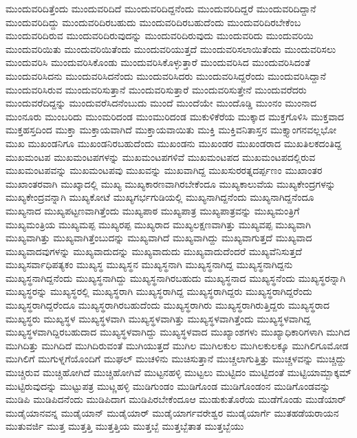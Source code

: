 {ಮುಂದುವರಿದಿತ್ತೆಂದು
ಮುಂದುವರಿದಿದೆ
ಮುಂದುವರಿದಿದ್ದನೆಂದು
ಮುಂದುವರಿದಿದ್ದರೆ
ಮುಂದುವರಿದಿದ್ದಾನೆ
ಮುಂದುವರಿದಿದ್ದು
ಮುಂದುವರಿದಿರಬಹುದು
ಮುಂದುವರಿದಿರಬಹುದೆಂದು
ಮುಂದುವರಿದಿರಬೇಕೆಂಬ
ಮುಂದುವರಿದಿರುವ
ಮುಂದುವರಿದಿರುವುದನ್ನು
ಮುಂದುವರಿದಿರುವುದು
ಮುಂದುವರಿದು
ಮುಂದುವರಿಯಿ
ಮುಂದುವರಿಯಿತು
ಮುಂದುವರಿಯಿತೆಂದು
ಮುಂದುವರಿಯುತ್ತದೆ
ಮುಂದುವರಿಸಲಾಯಿತೆಂದು
ಮುಂದುವರಿಸಲು
ಮುಂದುವರಿಸಿ
ಮುಂದುವರಿಸಿಕೊಂಡು
ಮುಂದುವರಿಸಿಕೊಳ್ಳುತ್ತಾರೆ
ಮುಂದುವರಿಸಿದ
ಮುಂದುವರಿಸಿದಂತೆ
ಮುಂದುವರಿಸಿದನು
ಮುಂದುವರಿಸಿದನೆಂದು
ಮುಂದುವರಿಸಿದರು
ಮುಂದುವರಿಸಿದ್ದರೆಂದು
ಮುಂದುವರಿಸಿದ್ದಾನೆ
ಮುಂದುವರಿಸಿರುವ
ಮುಂದುವರಿಸುತ್ತಾನೆ
ಮುಂದುವರಿಸುತ್ತಾರೆ
ಮುಂದುವರಿಸುತ್ತೇನೆ
ಮುಂದುವರೆದರು
ಮುಂದುವರೆದಿದ್ದನ್ನು
ಮುಂದುವರೆಸಿದನೆಂಬುದು
ಮುಂದೆ
ಮುಂದೆಯೇ
ಮುಂದೊಡ್ಡಿ
ಮುಂನಂ
ಮುಂನಾದ
ಮುಂನೂರು
ಮುಂಬರಿದು
ಮುಂಮರಿದಂಡ
ಮುಂಮುರಿದಂಡ
ಮುಕುಳಿಕೆರೆಯ
ಮುಕ್ಕಾದ
ಮುಕ್ತಗೊಳಿಸಿ
ಮುಕ್ತವಾದ
ಮುಕ್ತಹಸ್ತದಿಂದ
ಮುಕ್ತಾ
ಮುಕ್ತಾಯವಾಗಿದೆ
ಮುಕ್ತಾಯವಾಯಿತು
ಮುಕ್ತಿ
ಮುಕ್ತಿವನಿತಾಸ್ತನ
ಮುಕ್ತ್ಯಾಂಗನವಲ್ಲಭೋ
ಮುಖ
ಮುಖಂಡನಿಗೂ
ಮುಖಂಡನಿರಬಹುದೆಂದು
ಮುಖಂಡನು
ಮುಖಂಡರ
ಮುಖಂಡರಾದ
ಮುಖತಿಲಕದಂತಿದ್ದ
ಮುಖಮಂಟಪ
ಮುಖಮಂಟಪಗಳನ್ನು
ಮುಖಮಂಟಪಗಳಿವೆ
ಮುಖಮಂಟಪದ
ಮುಖಮಂಟಪದಲ್ಲಿರುವ
ಮುಖಮಂಟಪವನ್ನು
ಮುಖಮಂಟಪವು
ಮುಖವನ್ನು
ಮುಖವಾಗಿದ್ದ
ಮುಖಸುರರತ್ನದರ್ಪ್ಪಣಂ
ಮುಖಾಂತರ
ಮುಖಾಂತರವಾಗಿ
ಮುಖ್ಕಾದಲ್ಲಿ
ಮುಖ್ಯ
ಮುಖ್ಯಕಾರಣವಾಗಿರಬೇಕೆಂದೂ
ಮುಖ್ಯಕಾಲುವೆಯ
ಮುಖ್ಯಕೇಂದ್ರಗಳನ್ನು
ಮುಖ್ಯಕೇಂದ್ರವನ್ನಾಗಿ
ಮುಖ್ಯಕೋಟೆ
ಮುಖ್ಯಗರ್ಭಗುಡಿಯಲ್ಲಿ
ಮುಖ್ಯನಾಗಿದ್ದನೆಂದು
ಮುಖ್ಯನಾಗಿದ್ದನೆಂದೂ
ಮುಖ್ಯನಾದ
ಮುಖ್ಯಪಟ್ಟಣವಾಗಿತ್ತೆಂದು
ಮುಖ್ಯಪಾಠ
ಮುಖ್ಯಪಾತ್ರ
ಮುಖ್ಯಪಾತ್ರವನ್ನು
ಮುಖ್ಯಮಂತ್ರಿಗೆ
ಮುಖ್ಯಮಂತ್ರಿಯ
ಮುಖ್ಯಮಪ್ಪ
ಮುಖ್ಯರಪ್ಪ
ಮುಖ್ಯರಾದ
ಮುಖ್ಯಲಕ್ಷಣವಾಗಿತ್ತು
ಮುಖ್ಯವಪ್ಪ
ಮುಖ್ಯವಾಗಿ
ಮುಖ್ಯವಾಗಿತ್ತು
ಮುಖ್ಯವಾಗಿತ್ತೆಂಬುದನ್ನು
ಮುಖ್ಯವಾಗಿದೆ
ಮುಖ್ಯವಾಗಿದ್ದು
ಮುಖ್ಯವಾಗುತ್ತದೆ
ಮುಖ್ಯವಾದ
ಮುಖ್ಯವಾದವುಗಳನ್ನು
ಮುಖ್ಯವಾದುದನ್ನು
ಮುಖ್ಯವಾದುದು
ಮುಖ್ಯವಾದುದೆಂದರೆ
ಮುಖ್ಯವೆನಿಸುತ್ತದೆ
ಮುಖ್ಯಸರ್ವಾಧಿಪತ್ಯಕಂ
ಮುಖ್ಯಸ್ಥ
ಮುಖ್ಯಸ್ಥನ
ಮುಖ್ಯಸ್ಥನಾಗಿ
ಮುಖ್ಯಸ್ಥನಾಗಿದ್ದ
ಮುಖ್ಯಸ್ಥನಾಗಿದ್ದನು
ಮುಖ್ಯಸ್ಥನಾಗಿದ್ದನೆಂದು
ಮುಖ್ಯಸ್ಥನಾಗಿದ್ದು
ಮುಖ್ಯಸ್ಥನಾಗಿರಬಹುದು
ಮುಖ್ಯಸ್ಥನಾದ
ಮುಖ್ಯಸ್ಥನೆಂದು
ಮುಖ್ಯಸ್ಥರನ್ನಾಗಿ
ಮುಖ್ಯಸ್ಥರನ್ನು
ಮುಖ್ಯಸ್ಥರಲ್ಲಿ
ಮುಖ್ಯಸ್ಥರಾಗಿ
ಮುಖ್ಯಸ್ಥರಾಗಿದ್ದ
ಮುಖ್ಯಸ್ಥರಾಗಿದ್ದರು
ಮುಖ್ಯಸ್ಥರಾಗಿದ್ದರೆಂದು
ಮುಖ್ಯಸ್ಥರಾಗಿದ್ದರೆಂದೂ
ಮುಖ್ಯಸ್ಥರಾಗಿರಬಹುದೆಂದು
ಮುಖ್ಯಸ್ಥರಾಗಿರು
ಮುಖ್ಯಸ್ಥರಾಗಿರುತ್ತಿದ್ದರು
ಮುಖ್ಯಸ್ಥರಾದ
ಮುಖ್ಯಸ್ಥರು
ಮುಖ್ಯಸ್ಥಳ
ಮುಖ್ಯಸ್ಥಳವಾಗಿ
ಮುಖ್ಯಸ್ಥಳವಾಗಿತ್ತು
ಮುಖ್ಯಸ್ಥಳವಾಗಿತ್ತೆಂದು
ಮುಖ್ಯಸ್ಥಳವಾಗಿದ್ದ
ಮುಖ್ಯಸ್ಥಳವಾಗಿದ್ದಿರಬಹುದಾದ
ಮುಖ್ಯಸ್ಥಳವಾಗಿದ್ದು
ಮುಖ್ಯಸ್ಥಳವಾದ
ಮುಖ್ಯಾಂಶಗಳು
ಮುಖ್ಯಾಧಿಕಾರಿಗಳಾಗಿ
ಮುಗಿದ
ಮುಗಿದಿತ್ತು
ಮುಗಿದಿದೆ
ಮುಗಿದಿರುವಂತೆ
ಮುಗಿಯುತ್ತದೆ
ಮುಗಿಲ
ಮುಗಿಲಕುಲ
ಮುಗಿಲಕುಲಕ್ಕೂ
ಮುಗಿಲಿಗೂಮೋಡ
ಮುಗಿಲಿಗೆ
ಮುಗುಳ್ನಗೆಯೊಂದಿಗೆ
ಮುಘಲ್
ಮುಚಳಿನು
ಮುಚಿಸುತ್ತಾನೆ
ಮುಚ್ಚಲಾಗುತ್ತಿತ್ತು
ಮುಚ್ಚಳವನ್ನು
ಮುಚ್ಚಿದ್ದು
ಮುಚ್ಚಿರುವ
ಮುಚ್ಚಿಹೋಗಿದೆ
ಮುಚ್ಚಿಹೋಗಿವೆ
ಮುಟ್ಟನಹಳ್ಳಿ
ಮುಟ್ಟಲು
ಮುಟ್ಟಿದಂ
ಮುಟ್ಟಿದಂತೆ
ಮುಟ್ಟಿಯಾಮ್ಬಾಕ್ಕಮ್
ಮುಟ್ಟಿರುವುದನ್ನು
ಮುಟ್ಟುಪತ್ರ
ಮುಟ್ಣಹಳ್ಳಿ
ಮುಡಿಗುಂಡಂ
ಮುಡಿಗೊಂಡ
ಮುಡಿಗೊಂಡಂನ
ಮುಡಿಗೊಂಡವನ್ನು
ಮುಡಿಪಿ
ಮುಡಿಪಿದನೆಂದು
ಮುಡಿಪಿದಾಗ
ಮುಡಿಪಿರಬೇಕೆಂದೂಆ
ಮುಡುಕುತೊರೆಯ
ಮುಡೆಗೊಂಡು
ಮುಡೆಯಾರ್
ಮುಡೈಯಾನವನ್ನ
ಮುಡೈಯಾನ್
ಮುಡೈಯಾರ್
ಮುಡೈಯಾರ್ಗವರೇಶ್ವರ
ಮುಡೈಯಾರ್ಗೆ
ಮುತಹಡೆಯರಾಯನ
ಮುತುವರ್ಜಿ
ಮುತ್ತ
ಮುತ್ತತ್ತಿ
ಮುತ್ತತ್ತಿಯ
ಮುತ್ತಬ್ಬೆ
ಮುತ್ತಬ್ಬೆತಾತ
ಮುತ್ತಬ್ಬೆಯು
}
